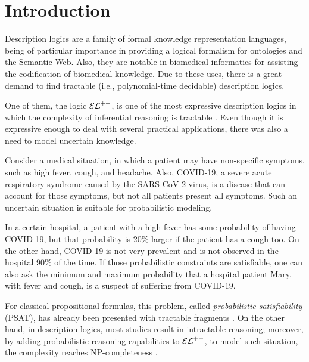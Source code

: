 
\chapter{Introduction}
\label{cap:introduction}
Description logics are a family of formal knowledge representation languages, being of particular importance in providing a logical formalism for ontologies and the Semantic Web. Also, they are notable in biomedical informatics for assisting the codification of biomedical knowledge. Due to these uses, there is a great demand to find tractable (i.e., polynomial-time decidable) description logics.

One of them, the logic $\mathcal{EL}^{++}$, is one of the most expressive description logics in which the complexity of inferential reasoning is tractable \citep{Baader2005a}. Even though it is expressive enough to deal with several practical applications, there was also a need to model uncertain knowledge.

\begin{example}
  \label{exmp:real-example}
Consider a medical situation, in which a patient may have non-specific symptoms, such as high fever, cough, and headache. Also, COVID-19, a severe acute respiratory syndrome caused by the  SARS-CoV-2 virus, is a disease that can account for those symptoms, but not all patients present all symptoms. Such an uncertain situation is suitable for probabilistic modeling.

In a certain hospital, a patient with a high fever has some probability of having COVID-19, but that probability is 20\% larger if the patient has a cough too. On the other hand, COVID-19 is not very prevalent and is not observed in the hospital 90\% of the time. If those probabilistic constraints are satisfiable, one can also ask the minimum and maximum probability that a hospital patient Mary, with fever and cough, is a suspect of suffering from COVID-19.
\end{example}

For classical propositional formulas, this problem, called \emph{probabilistic satisfiability} (PSAT), has already been presented with tractable fragments \citep{andersen2001easy}. On the other hand, in description logics, most studies result in intractable reasoning; moreover, by adding probabilistic reasoning capabilities to $\mathcal{EL}^{++}$, to model such situation, the complexity reaches NP-completeness \citep{Fin2019b}.

